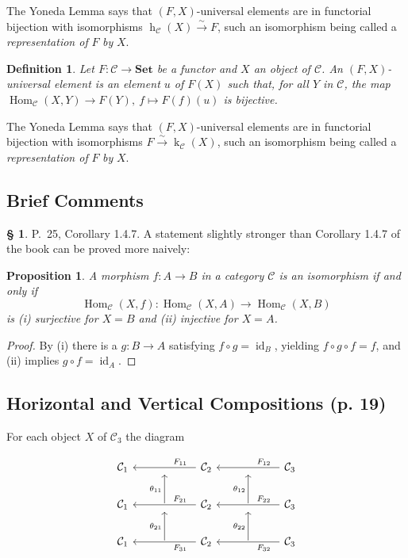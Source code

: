 \documentclass[12pt]{article}%
\newtheorem{prop}[thm]{Proposition}
\newtheorem{df}[thm]{Definition}%
\theoremstyle{remark}
\theoremstyle{definition}
\newtheorem{s}[thm]{\S}%
\newcommand{\C}{\mathcal C}
\newcommand{\Set}{\mathbf{Set}}%
\newcommand{\xr}{\xrightarrow}
\DeclareMathOperator{\hy}{h}
\DeclareMathOperator{\ky}{k}
\DeclareMathOperator{\id}{id}
\DeclareMathOperator{\Hom}{Hom}%
\begin{document}
The Yoneda Lemma says that $(F,X)$\--universal elements are in functorial bijection with isomorphisms $\hy_\C(X)\xr\sim F$, such an isomorphism being called a {\em representation of} $F$ {\em by} $X$.

\begin{df}\label{ue2} 
Let $F:\C\to\Set$ be a functor and $X$ an object of $\C$. An $(F,X)$\--{\em universal element} is an element $u$ of $F(X)$ such that, for all $Y$ in $\C$, the map $\Hom_\C(X,Y)\to F(Y),\ f\mapsto F(f)(u)$ is bijective. 
\end{df}

The Yoneda Lemma says that $(F,X)$\--universal elements are in functorial bijection with isomorphisms $F\xr\sim\ky_\C(X)$, such an isomorphism being called a {\em representation of} $F$ {\em by} $X$.


\subsection{Brief Comments}

\begin{s} 
P.~25, Corollary 1.4.7. A statement slightly stronger than Corollary 1.4.7 of the book can be proved more naively:

\begin{prop}\label{yp}
A morphism $f:A\to B$ in a category $\C$ is an isomorphism if and only if 
$$
\Hom_\C(X,f):\Hom_\C(X,A)\to\Hom_\C(X,B)
$$
is (i) surjective for $X=B$ and (ii) injective for $X=A$.
\end{prop}

\begin{proof} By (i) there is a $g:B\to A$ satisfying $f\circ g=\id_B$, yielding $f\circ g\circ f=f$, and (ii) implies $g\circ f=\id_A$.
\end{proof}
\end{s}


\subsection{Horizontal and Vertical Compositions (p. 19)}\label{hove1}

For each object $X$ of $\C_3$ the diagram 

$$
\begin{tikzcd}
%
\C_1&{}&\C_2\ar{ll}{}[near start,swap]{F_{11}}&{}&\C_3\ar{ll}{}[near start,swap]{F_{12}}\\ 
%
\C_1&\ar{u}{\theta_{11}}&\C_2\ar{ll}{}[near start,swap]{F_{21}}&\ar{u}{\theta_{12}}&\C_3\ar{ll}{}[near start,swap]{F_{22}}\\ 
%
\C_1&\ar{u}{\theta_{21}}&\C_2\ar{ll}{}[near start]{F_{31}}&\ar{u}{\theta_{22}}&\C_3\ar{ll}{}[near start]{F_{32}}
%
\end{tikzcd}
$$ 
\end{document}

